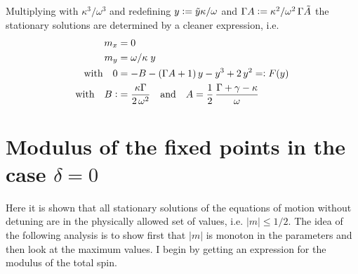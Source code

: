 Multiplying with $\kappa^3/\omega^3$ and redefining ${y}\vcentcolon=\tilde{y}\kappa/\omega$ and $\Gamma A\vcentcolon=\kappa^2/\omega^2\,\Gamma\tilde{A}$ the stationary solutions are determined by a cleaner expression, i.e.
\begin{align*}
    m_x&=0\\
    m_y&={\omega}/{\kappa}\;{y}\\
    \text{with}\quad0&=-B-(\Gamma A+1)\,{y}    - {y}^3+2\,{y}^2=\vcentcolon F({y})\\
    \text{with}\quad B\vcentcolon&= \frac{{\kappa}\Gamma}{{2}\,{\omega}^2}\quad\text{and}\quad A =\frac{1}{2}\, \frac{\Gamma+\gamma-\kappa}{\omega}
\end{align*}

    \section{Modulus of the fixed points in the case $\delta=0$}
    \label{appendix:mod_of_fixp}
    Here it is shown that all stationary solutions of the equations of motion without detuning are in the physically allowed set of values, i.e. $|m|\leq1/2$.
    The idea of the following analysis is to show first that $|m|$ is monoton in the parameters and then look at the maximum values. I begin by getting an expression for the modulus of the total spin.
    
